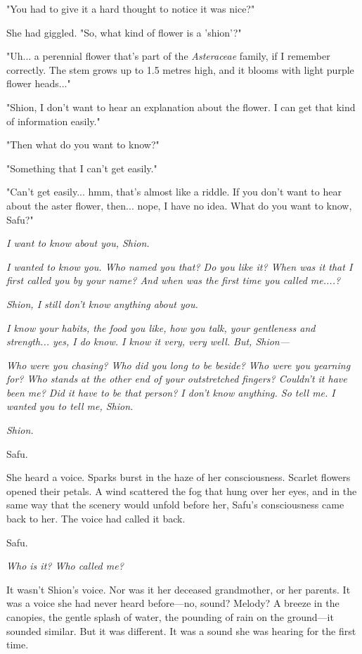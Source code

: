 "You had to give it a hard thought to notice it was nice?"

She had giggled. "So, what kind of flower is a 'shion'?"

"Uh... a perennial flower that's part of the \emph{Asteraceae} family, if I
remember correctly. The stem grows up to 1.5 metres high, and it blooms
with light purple flower heads..."

"Shion, I don't want to hear an explanation about the flower. I can get
that kind of information easily."

"Then what do you want to know?"

"Something that I can't get easily."

"Can't get easily... hmm, that's almost like a riddle. If you don't want
to hear about the aster flower, then... nope, I have no idea. What do
you want to know, Safu?"

\emph{I want to know about you, Shion.}

\emph{I wanted to know you. Who named you that? Do you like it? When was
it that I first called you by your name? And when was the first time you
called me....?}

\emph{Shion, I still don't know anything about you.}

\emph{I know your habits, the food you like, how you talk, your
gentleness and strength... yes, I do know. I know it very, very well.
But, Shion---}

\emph{Who were you chasing? Who did you long to be beside? Who were you
yearning for? Who stands at the other end of your outstretched fingers?
Couldn't it have been me? Did it have to be that person? I don't know
anything. So tell me. I wanted you to tell me, Shion.}

\emph{Shion.}

\myspace

Safu.

She heard a voice. Sparks burst in the haze of her consciousness.
Scarlet flowers opened their petals. A wind scattered the fog that hung
over her eyes, and in the same way that the scenery would unfold before
her, Safu's consciousness came back to her. The voice had called it
back.

Safu.

\emph{Who is it? Who called me?}

It wasn't Shion's voice. Nor was it her deceased grandmother, or her
parents. It was a voice she had never heard before---no, sound? Melody? A
breeze in the canopies, the gentle splash of water, the pounding of rain
on the ground---it sounded similar. But it was different. It was a sound
she was hearing for the first time.

